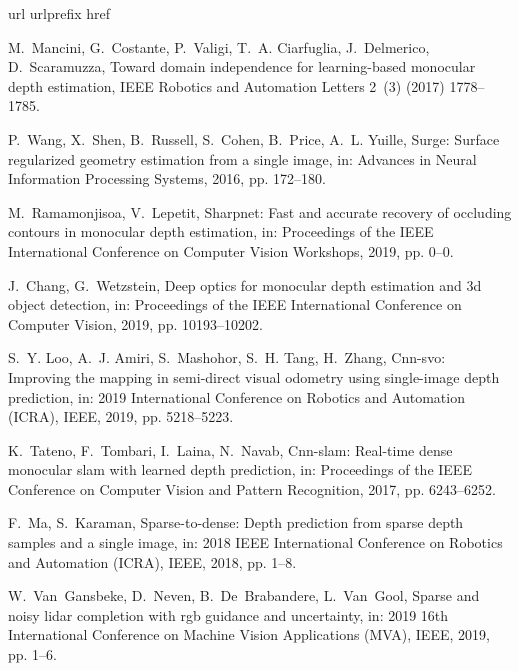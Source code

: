\documentclass[5p]{elsarticle}
\begin{document}
\begin{thebibliography}{100}
\expandafter\ifx\csname url\endcsname\relax
  \def\url#1{\texttt{#1}}\fi
\expandafter\ifx\csname urlprefix\endcsname\relax\def\urlprefix{URL }\fi
\expandafter\ifx\csname href\endcsname\relax
  \def\href#1#2{#2} \def\path#1{#1}\fi

M.~Mancini, G.~Costante, P.~Valigi, T.~A. Ciarfuglia, J.~Delmerico,
  D.~Scaramuzza, Toward domain independence for learning-based monocular depth
  estimation, IEEE Robotics and Automation Letters 2~(3) (2017) 1778--1785.

P.~Wang, X.~Shen, B.~Russell, S.~Cohen, B.~Price, A.~L. Yuille, Surge: Surface
  regularized geometry estimation from a single image, in: Advances in Neural
  Information Processing Systems, 2016, pp. 172--180.

M.~Ramamonjisoa, V.~Lepetit, Sharpnet: Fast and accurate recovery of occluding
  contours in monocular depth estimation, in: Proceedings of the IEEE
  International Conference on Computer Vision Workshops, 2019, pp. 0--0.

J.~Chang, G.~Wetzstein, Deep optics for monocular depth estimation and 3d
  object detection, in: Proceedings of the IEEE International Conference on
  Computer Vision, 2019, pp. 10193--10202.

S.~Y. Loo, A.~J. Amiri, S.~Mashohor, S.~H. Tang, H.~Zhang, Cnn-svo: Improving
  the mapping in semi-direct visual odometry using single-image depth
  prediction, in: 2019 International Conference on Robotics and Automation
  (ICRA), IEEE, 2019, pp. 5218--5223.

K.~Tateno, F.~Tombari, I.~Laina, N.~Navab, Cnn-slam: Real-time dense monocular
  slam with learned depth prediction, in: Proceedings of the IEEE Conference on
  Computer Vision and Pattern Recognition, 2017, pp. 6243--6252.

F.~Ma, S.~Karaman, Sparse-to-dense: Depth prediction from sparse depth samples
  and a single image, in: 2018 IEEE International Conference on Robotics and
  Automation (ICRA), IEEE, 2018, pp. 1--8.

W.~Van~Gansbeke, D.~Neven, B.~De~Brabandere, L.~Van~Gool, Sparse and noisy
  lidar completion with rgb guidance and uncertainty, in: 2019 16th
  International Conference on Machine Vision Applications (MVA), IEEE, 2019,
  pp. 1--6.


\end{thebibliography}
\end{document}
